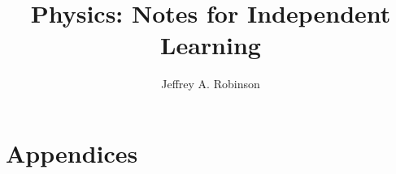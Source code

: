 \documentclass[oneside]{book}
\title{Physics: Notes for Independent Learning}
\author{Jeffrey A. Robinson}
\theoremstyle{definition}
\begin{document}
\frontmatter

\maketitle
\tableofcontents

\mainmatter





\backmatter

\appendix
\part{Appendices}



\printindex
\end{document}
